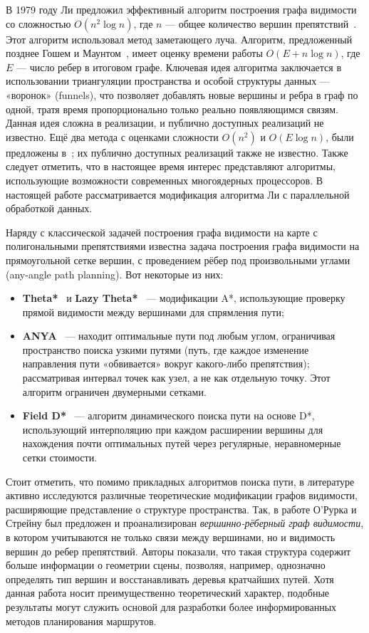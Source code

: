 \documentclass[intlimits,twoside,a4paper,11pt]{article}
\theoremstyle{definition}
\begin{document}
В 1979 году Ли предложил эффективный алгоритм построения графа
видимости со сложностью $O(n^2 \log n)$, где $n$ --- общее количество
вершин препятствий~\cite{lee78,coleman2012visibility}.
Этот алгоритм использовал метод заметающего луча.
Алгоритм, предложенный позднее Гошем и Маунтом~\cite{ghosh87},
имеет оценку времени работы $O(E + n \log n)$, где $E$ — число ребер в итоговом графе.
Ключевая идея алгоритма заключается в
использовании триангуляции пространства и особой структуры данных —
«воронок» (funnels), что позволяет добавлять новые вершины и ребра в граф
по одной, тратя время пропорционально только реально появляющимся связям.
Данная идея сложна в реализации, и публично доступных реализаций не известно.
Ещё два метода с оценками сложности $O(n^2)$ и $O(E \log n)$, были предложены
в~\cite{OvermarsWelzl}; их публично доступных реализаций также не известно.
Также следует отметить, что в настоящее время интерес представляют
алгоритмы, использующие возможности современных многоядерных
процессоров. В настоящей работе рассматривается модификация алгоритма
Ли с параллельной обработкой данных.

Наряду с классической задачей построения графа видимости на карте с
полигональными препятствиями известна задача построения графа
видимости на прямоугольной сетке вершин, с проведением рёбер под
произвольными углами (any-angle path
planning). Вот некоторые из них:

\begin{itemize}
    \item \textbf{Theta*}~\cite{theta} и \textbf{Lazy Theta*}~\cite{nash10lazy} --- модификации A*, использующие проверку 
    прямой видимости между вершинами для спрямления пути;
    \item \textbf{ANYA}~\cite{harabor16anya} --- находит оптимальные пути под любым углом, ограничивая пространство поиска узкими путями 
        (путь, где каждое изменение направления пути «обвивается» вокруг какого-либо препятствия); 
        рассматривая интервал точек как узел, а не как отдельную точку. 
        Этот алгоритм ограничен двумерными сетками.
    \item \textbf{Field D*}~\cite{FieldDstar} --- алгоритм динамического поиска пути на основе D*, 
        использующий интерполяцию при каждом расширении вершины для нахождения почти оптимальных путей через регулярные, 
        неравномерные сетки стоимости.
\end{itemize}

Стоит отметить, что помимо прикладных алгоритмов поиска пути, в литературе активно исследуются
различные теоретические модификации графов видимости, расширяющие представление о структуре пространства.
Так, в работе О'Рурка и Стрейну \cite{orourke98vertexedge} был предложен и проанализирован
\textit{вершинно-рёберный граф видимости}, в котором учитываются не только связи между вершинами,
но и видимость вершин до ребер препятствий. Авторы показали, что такая структура содержит больше
информации о геометрии сцены, позволяя, например, однозначно определять тип вершин и восстанавливать
деревья кратчайших путей. Хотя данная работа носит преимущественно теоретический характер,
подобные результаты могут служить основой для разработки более информированных методов планирования маршрутов.
\end{document}
